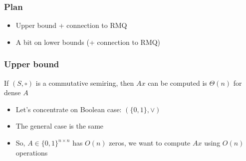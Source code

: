 \documentclass{beamer}
\begin{document}
\begin{frame}
\frametitle{Plan}

\begin{itemize}
\item Upper bound + connection to RMQ
\item A bit on lower bounds (+ connection to RMQ)
\end{itemize}



\end{frame}



\begin{frame}
\frametitle{Upper bound}

\begin{theorem}[restated]
If $(S,\circ)$ is a commutative semiring, then $Ax$ can be computed is $\Theta(n)$ for dense $A$
\end{theorem}


\begin{itemize}
\item Let's concentrate on Boolean case: $(\{0,1\},\vee)$
\item The general case is the same
\item So, $A \in \{0,1\}^{n\times n}$ has $O(n)$ zeros, we want to compute $Ax$ using $O(n)$ operations
\end{itemize}


\end{frame}
\end{document}

